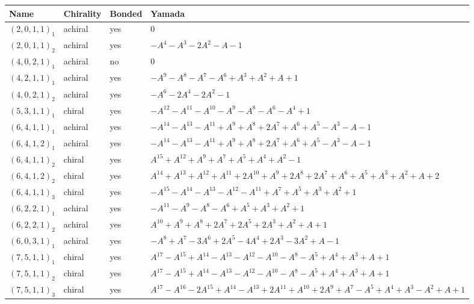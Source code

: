 \begin{table}[h]
\centering
\begin{tabular}{lll}
\hline
Name & Chirality & Bonded & Yamada \\
\hline
$(2,0,1,1)_{1}$ & achiral & yes & $0$ \\
$(2,0,1,1)_{2}$ & achiral & yes & $-A^{4} - A^{3} - 2A^{2} - A - 1$ \\
$(4,0,2,1)_{1}$ & achiral & no & $0$ \\
$(4,2,1,1)_{1}$ & achiral & yes & $-A^{9} - A^{8} - A^{7} - A^{6} + A^{3} + A^{2} + A + 1$ \\
$(4,0,2,1)_{2}$ & achiral & yes & $-A^{6} - 2A^{4} - 2A^{2} - 1$ \\
$(5,3,1,1)_{1}$ & chiral & yes & $-A^{12} - A^{11} - A^{10} - A^{9} - A^{8} - A^{6} - A^{4} + 1$ \\
$(6,4,1,1)_{1}$ & achiral & yes & $-A^{14} - A^{13} - A^{11} + A^{9} + A^{8} + 2A^{7} + A^{6} + A^{5} - A^{3} - A - 1$ \\
$(6,4,1,2)_{1}$ & achiral & yes & $-A^{14} - A^{13} - A^{11} + A^{9} + A^{8} + 2A^{7} + A^{6} + A^{5} - A^{3} - A - 1$ \\
$(6,4,1,1)_{2}$ & chiral & yes & $A^{15} + A^{12} + A^{9} + A^{7} + A^{5} + A^{4} + A^{2} - 1$ \\
$(6,4,1,2)_{2}$ & chiral & yes & $A^{14} + A^{13} + A^{12} + A^{11} + 2A^{10} + A^{9} + 2A^{8} + 2A^{7} + A^{6} + A^{5} + A^{3} + A^{2} + A + 2$ \\
$(6,4,1,1)_{3}$ & chiral & yes & $-A^{15} - A^{14} - A^{13} - A^{12} - A^{11} + A^{7} + A^{5} + A^{3} + A^{2} + 1$ \\
$(6,2,2,1)_{1}$ & achiral & yes & $-A^{11} - A^{9} - A^{8} - A^{6} + A^{5} + A^{3} + A^{2} + 1$ \\
$(6,2,2,1)_{2}$ & achiral & yes & $A^{10} + A^{9} + A^{8} + 2A^{7} + 2A^{5} + 2A^{3} + A^{2} + A + 1$ \\
$(6,0,3,1)_{1}$ & achiral & yes & $-A^{8} + A^{7} - 3A^{6} + 2A^{5} - 4A^{4} + 2A^{3} - 3A^{2} + A - 1$ \\
$(7,5,1,1)_{1}$ & chiral & yes & $A^{17} - A^{15} + A^{14} - A^{13} - A^{12} - A^{10} - A^{8} - A^{5} + A^{4} + A^{3} + A + 1$ \\
$(7,5,1,1)_{2}$ & chiral & yes & $A^{17} - A^{15} + A^{14} - A^{13} - A^{12} - A^{10} - A^{8} - A^{5} + A^{4} + A^{3} + A + 1$ \\
$(7,5,1,1)_{3}$ & chiral & yes & $A^{17} - A^{16} - 2A^{15} + A^{14} - A^{13} + 2A^{11} + A^{10} + 2A^{9} + A^{7} - A^{5} + A^{4} + A^{3} - A^{2} + A + 1$ \\

\end{tabular}
\end{table}
